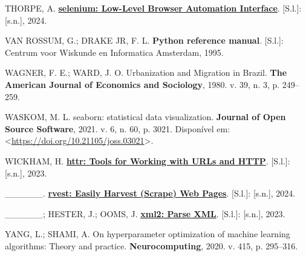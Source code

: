 \documentclass[
  12pt,
  a4paper,
]{scrreprt}
\newlength{\cslhangindent}
\newenvironment{CSLReferences}[2] %
 {\begin{list}{}{%
  \setlength{\itemindent}{0pt}
  \setlength{\leftmargin}{0pt}
  \setlength{\parsep}{0pt}
  \ifodd #1
   \setlength{\leftmargin}{\cslhangindent}
   \setlength{\itemindent}{-1\cslhangindent}
  \fi
  \setlength{\itemsep}{#2\baselineskip}}}
 {\end{list}}
\begin{document}
\begin{CSLReferences}{0}{1}
THORPE, A.
\textbf{\href{https://CRAN.R-project.org/package=selenium}{selenium:
Low-Level Browser Automation Interface}}. {[}S.l.{]}: {[}s.n.{]}, 2024.

VAN ROSSUM, G.; DRAKE JR, F. L. \textbf{Python reference manual}.
{[}S.l.{]}: Centrum voor Wiskunde en Informatica Amsterdam, 1995.

WAGNER, F. E.; WARD, J. O. Urbanization and Migration in Brazil.
\textbf{The American Journal of Economics and Sociology}, 1980. v. 39,
n. 3, p. 249--259.

WASKOM, M. L. seaborn: statistical data visualization. \textbf{Journal
of Open Source Software}, 2021. v. 6, n. 60, p. 3021. Disponível em:
\textless{}\url{https://doi.org/10.21105/joss.03021}\textgreater.

WICKHAM, H. \textbf{\href{https://CRAN.R-project.org/package=httr}{httr:
Tools for Working with URLs and HTTP}}. {[}S.l.{]}: {[}s.n.{]}, 2023.

\_\_\_\_\_\_. \textbf{\href{https://rvest.tidyverse.org/}{rvest: Easily
Harvest (Scrape) Web Pages}}. {[}S.l.{]}: {[}s.n.{]}, 2024.

\_\_\_\_\_\_; HESTER, J.; OOMS, J.
\textbf{\href{https://xml2.r-lib.org/}{xml2: Parse XML}}. {[}S.l.{]}:
{[}s.n.{]}, 2023.

YANG, L.; SHAMI, A. On hyperparameter optimization of machine learning
algorithms: Theory and practice. \textbf{Neurocomputing}, 2020. v. 415,
p. 295--316.

\end{CSLReferences}
\end{document}

